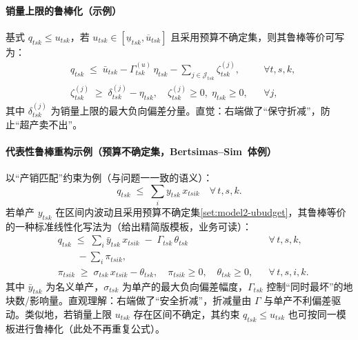 \paragraph{销量上限的鲁棒化（示例）}
基式 $q_{tsk} \le u_{tsk}$，若 $u_{tsk}\in[\underline{u}_{tsk},\overline{u}_{tsk}]$ 且采用预算不确定集，则其鲁棒等价可写为：
\begin{align}
  & q_{tsk} \;\le\; \bar{u}_{tsk} - \Gamma_{tsk}^{(u)}\,\eta_{tsk} - \sum_{j\in\mathcal{J}_{tsk}} \zeta_{tsk}^{(j)}, && \forall t,s,k, \label{cons:model2-rc-cap-1}\\
  & \zeta_{tsk}^{(j)} \;\ge\; \delta_{tsk}^{(j)} - \eta_{tsk},\quad \zeta_{tsk}^{(j)}\ge 0,\; \eta_{tsk}\ge 0, && \forall j, \label{cons:model2-rc-cap-2}
\end{align}
其中 $\delta_{tsk}^{(j)}$ 为销量上限的最大负向偏差分量。直觉：右端做了“保守折减”，防止“超产卖不出”。

\paragraph{代表性鲁棒重构示例（预算不确定集，Bertsimas–Sim \cite{bertsimas2004price}\,体例）}
以“产销匹配”约束为例（与问题一一致的语义）：
\begin{equation}
  q_{tsk} \;\le\; \sum_{i} y_{tsk}\,x_{tsik} \quad \forall\,t,s,k. \label{cons:model2-sales-prod-base}
\end{equation}
若单产 $y_{tsk}$ 在区间内波动且采用预算不确定集\eqref{set:model2-ubudget}，其鲁棒等价的一种标准线性化写法为（给出精简版模板，业务可读）：
\begin{align}
  & q_{tsk} \;\le\; \sum_{i} \bar{y}_{tsk}\,x_{tsik} \;-\; \Gamma_{tsk}\,\theta_{tsk} && \forall\,t,s,k, \label{cons:model2-rc-yield-1} \\
  & \qquad - \sum_{i} \pi_{tsik}, && \nonumber \\
  & \pi_{tsik} \;\ge\; \sigma_{tsk}\,x_{tsik} - \theta_{tsk},\quad \pi_{tsik} \ge 0,\quad \theta_{tsk} \ge 0, && \forall\,t,s,i,k. \label{cons:model2-rc-yield-2}
\end{align}
其中 $\bar{y}_{tsk}$ 为名义单产，$\sigma_{tsk}$ 为单产的最大负向偏差幅度，$\Gamma_{tsk}$ 控制“同时最坏”的地块数/影响量。直观理解：右端做了“安全折减”，折减量由 $\Gamma$ 与单产不利偏差驱动。类似地，若销量上限 $u_{tsk}$ 存在区间不确定，其约束 $q_{tsk}\le u_{tsk}$ 也可按同一模板进行鲁棒化（此处不再重复公式）。

